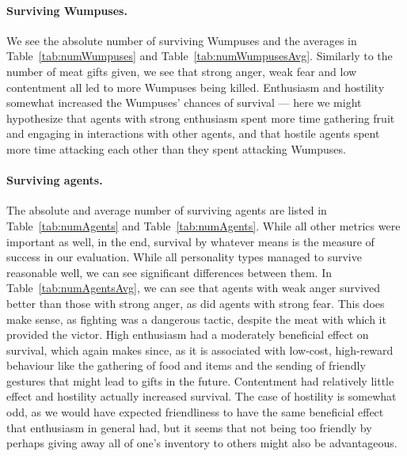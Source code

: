 \paragraph{Surviving Wumpuses.} We see the absolute number of surviving Wumpuses and the averages in Table~\ref{tab:numWumpuses} and Table~\ref{tab:numWumpusesAvg}. Similarly to the number of meat gifts given, we see that strong anger, weak fear and low contentment all led to more Wumpuses being killed. Enthusiasm and hostility somewhat increased the Wumpuses' chances of survival --- here we might hypothesize that agents with strong enthusiasm spent more time gathering fruit and engaging in interactions with other agents, and that hostile agents spent more time attacking each other than they spent attacking Wumpuses.

\paragraph{Surviving agents.} The absolute and average number of surviving agents are listed in Table~\ref{tab:numAgents} and Table~\ref{tab:numAgents}. While all other metrics were important as well, in the end, survival by whatever means is the measure of success in our evaluation. While all personality types managed to survive reasonable well, we can see significant differences between them. In Table~\ref{tab:numAgentsAvg}, we can see that agents with weak anger survived better than those with strong anger, as did agents with strong fear. This does make sense, as fighting was a dangerous tactic, despite the meat with which it provided the victor. High enthusiasm had a moderately beneficial effect on survival, which again makes since, as it is associated with low-cost, high-reward behaviour like the gathering of food and items and the sending of friendly gestures that might lead to gifts in the future. Contentment had relatively little effect and hostility actually increased survival. The case of hostility is somewhat odd, as we would have expected friendliness to have the same beneficial effect that enthusiasm in general had, but it seems that not being too friendly by perhaps giving away all of one's inventory to others might also be advantageous.

